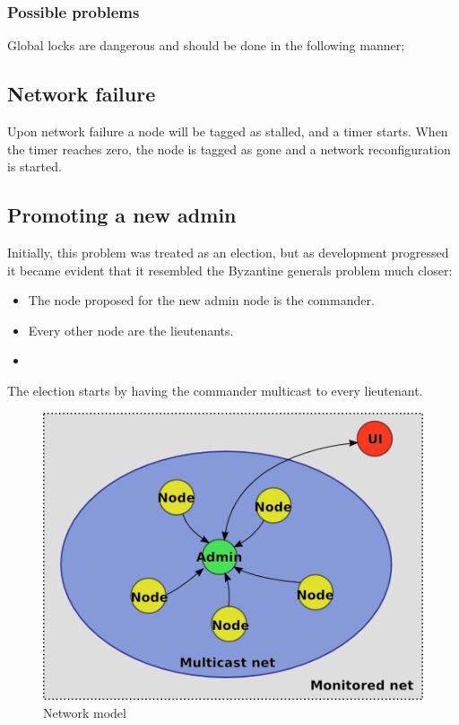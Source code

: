 \documentclass[10pt,a4paper]{article}
\begin{document}
\subsubsection{Possible problems}
Global locks are dangerous and should be done in the following manner; 

\subsection{Network failure}

Upon network failure a node will be tagged as stalled, and a timer starts. When the timer reaches zero, the node is tagged as gone and a network reconfiguration is started.

\subsection{Promoting a new admin}
Initially, this problem was treated as an election, but as development progressed it became evident that it resembled the Byzantine generals problem much closer:
\begin{itemize}
\item The node proposed for the new admin node is the commander.
\item Every other node are the lieutenants.
\item 
\end{itemize}

The election starts by having the commander multicast %
to every lieutenant.

\begin{figure}[h]
\centering
\includegraphics[scale=0.65]{fig/Networkmodel.png}
 \caption{Network model}
 \label{fig:network_model}
\end{figure}
\end{document}
